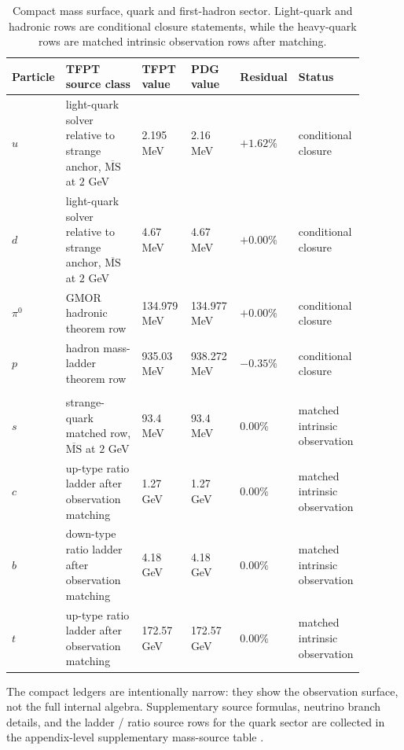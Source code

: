 \begin{table}[p]
\centering
\scriptsize
\setlength{\tabcolsep}{3pt}
\begin{tabularx}{\linewidth}{@{}>{\raggedright\arraybackslash}p{0.10\linewidth}>{\raggedright\arraybackslash}p{0.27\linewidth}>{\raggedleft\arraybackslash}p{0.15\linewidth}>{\raggedleft\arraybackslash}p{0.15\linewidth}>{\raggedleft\arraybackslash}p{0.10\linewidth}>{\raggedright\arraybackslash}p{0.12\linewidth}@{}}
\toprule
Particle & TFPT source class & TFPT value & PDG value & Residual & Status \\
\midrule
$u$ & light-quark solver relative to strange anchor, $\overline{\mathrm{MS}}$ at $2$ GeV & \num{2.195} MeV & \num{2.16} MeV & $+1.62\%$ & conditional closure \\
$d$ & light-quark solver relative to strange anchor, $\overline{\mathrm{MS}}$ at $2$ GeV & \num{4.67} MeV & \num{4.67} MeV & $+0.00\%$ & conditional closure \\
$\pi^0$ & GMOR hadronic theorem row & \num{134.979} MeV & \num{134.977} MeV & $+0.00\%$ & conditional closure \\
$p$ & hadron mass-ladder theorem row & \num{935.03} MeV & \num{938.272} MeV & $-0.35\%$ & conditional closure \\
\midrule
\multicolumn{6}{@{}l}{\textit{Matched intrinsic observation surface:}} \\
$s$ & strange-quark matched row, $\overline{\mathrm{MS}}$ at $2$ GeV & \num{93.4} MeV & \num{93.4} MeV & $0.00\%$ & matched intrinsic observation \\
$c$ & up-type ratio ladder after observation matching & \num{1.27} GeV & \num{1.27} GeV & $0.00\%$ & matched intrinsic observation \\
$b$ & down-type ratio ladder after observation matching & \num{4.18} GeV & \num{4.18} GeV & $0.00\%$ & matched intrinsic observation \\
$t$ & up-type ratio ladder after observation matching & \num{172.57} GeV & \num{172.57} GeV & $0.00\%$ & matched intrinsic observation \\
\bottomrule
\end{tabularx}
\caption{Compact mass surface, quark and first-hadron sector. Light-quark and hadronic rows are conditional closure statements, while the heavy-quark rows are matched intrinsic observation rows after matching.}
\label{tab:sm-mass-ledger-quarks}
\end{table}

The compact ledgers are intentionally narrow: they show the observation surface, not the full
internal algebra. Supplementary source formulas, neutrino branch details, and the ladder / ratio
source rows for the quark sector are collected in the appendix-level supplementary mass-source
table .

